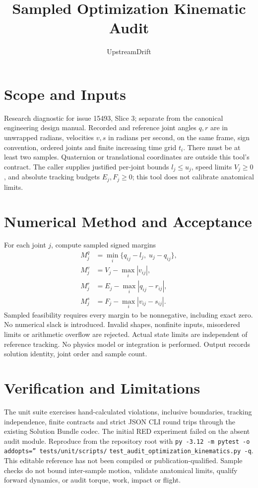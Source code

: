 \documentclass{article}
\title{Sampled Optimization Kinematic Audit}
\author{UpstreamDrift}
\date{}
\begin{document}
\maketitle
\section{Scope and Inputs}
Research diagnostic for issue 15493, Slice 3; separate from the canonical
engineering design manual. Recorded and reference joint angles $q,r$ are in
unwrapped radians, velocities $v,s$ in radians per second, on the same frame,
sign convention, ordered joints and finite increasing time grid $t_i$.
There must be at least two samples. Quaternion or translational coordinates
are outside this tool's contract. The caller supplies justified per-joint
bounds $l_j\le u_j$, speed limits $V_j\ge0$, and absolute tracking budgets
$E_j,F_j\ge0$; this tool does not calibrate anatomical limits.
\section{Numerical Method and Acceptance}
For each joint $j$, compute sampled signed margins
\begin{align*}
 M^q_j &= \min_i\{q_{ij}-l_j,\;u_j-q_{ij}\},\\
 M^v_j &= V_j-\max_i|v_{ij}|,\\
 M^r_j &= E_j-\max_i|q_{ij}-r_{ij}|,\\
 M^s_j &= F_j-\max_i|v_{ij}-s_{ij}|.
\end{align*}
Sampled feasibility requires every margin to be nonnegative, including exact
zero. No numerical slack is introduced. Invalid shapes, nonfinite inputs,
misordered limits or arithmetic overflow are rejected. Actual state limits
are independent of reference tracking. No physics model or integration is
performed. Output records solution identity, joint order and sample count.
\section{Verification and Limitations}
The unit suite exercises hand-calculated violations, inclusive boundaries,
tracking independence, finite contracts and strict JSON CLI round trips
through the existing Solution Bundle codec. The initial RED experiment
failed on the absent audit module. Reproduce from the repository root with
\texttt{py -3.12 -m pytest -o addopts='' tests/unit/scripts/}\allowbreak
\texttt{test\_audit\_optimization\_kinematics.py -q}.
This editable reference has not been compiled or publication-qualified.
Sample checks do not bound inter-sample motion, validate anatomical limits,
qualify forward dynamics, or audit torque, work, impact or flight.
\end{document}
